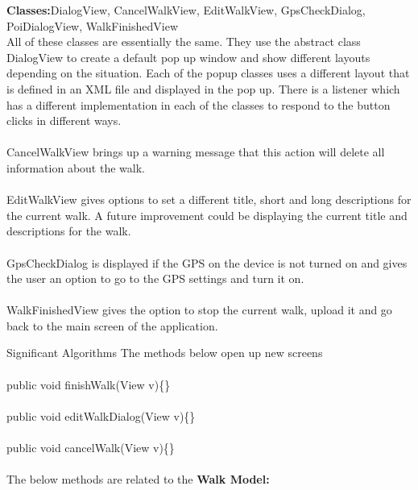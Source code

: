 \documentclass[12pt]{article}
\makeatletter
\renewcommand{\paragraph}{
  \@startsection{paragraph}{4}
  {\z@}{3.25ex \@plus -10em \@minus 1em}{0.1em}
  {\normalfont\normalsize\bfseries}
}
\makeatother
\begin{document}
\textbf{Classes:}DialogView, CancelWalkView, EditWalkView, GpsCheckDialog, PoiDialogView, WalkFinishedView~\\
All of these classes are essentially the same. They use the abstract class DialogView to create a default pop up window and show different layouts depending on the situation. Each of the popup classes uses a different layout that is defined in an XML file and displayed in the pop up. There is a listener which has a different implementation in each of the classes to respond to the button clicks in different ways.
~\\\\
CancelWalkView brings up a warning message that this action will delete all information about the walk.
~\\\\
EditWalkView gives options to set a different title, short and long descriptions for the current walk. A future improvement could be displaying the current title and descriptions for the walk.
~\\\\
GpsCheckDialog is displayed if the GPS on the device is not turned on and gives the user an option to go to the GPS settings and turn it on.
~\\\\
WalkFinishedView gives the option to stop the current walk, upload it and go back to the main screen of the application.
\paragraph{Significant Algorithms}
The methods below open up new screens
\\\\
public void finishWalk(View v)\{\}
\\\\
public void editWalkDialog(View v)\{\}
\\\\
public void cancelWalk(View v)\{\}
~\\\\
The below methods are related to the \textbf{Walk Model:}
\end{document}
